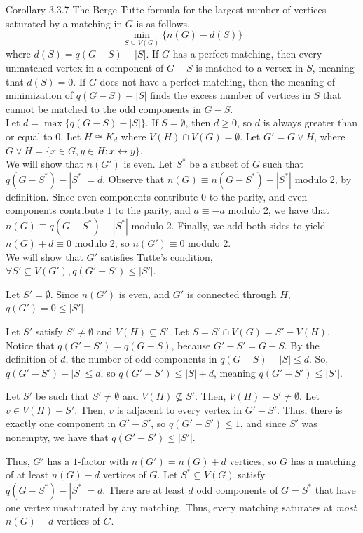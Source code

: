 \documentclass[10pt]{extarticle}
\begin{document}
  \begin{problem}{Corollary 3.3.7}
    The Berge-Tutte formula for the largest number of vertices saturated by a matching in $G$ is as follows.
    \[
      \underset{S\subseteq V(G)}{\min}\{n(G) - d(S)\}
    \] 
    where $d(S) = q(G-S) - |S|$.
    \tcblower
    If $G$ has a perfect matching, then every unmatched vertex in a component of $G-S$ is matched to a vertex in $S$, meaning that $d(S) = 0$. If $G$ does not have a perfect matching, then the meaning of minimization of $q(G - S) - |S|$ finds the excess number of vertices in $S$ that cannot be matched to the odd components in $G-S$.\\

    Let $d = \max\{q(G-S) - |S|\}$. If $S = \emptyset$, then $d \geq 0$, so $d$ is always greater than or equal to $0$. Let $H \cong K_d$ where $V(H) \cap V(G) = \emptyset$. Let $G' = G \vee H$, where $G\vee H = \{x\in G, y\in H: x\leftrightarrow y\}$.\\

    We will show that $n(G')$ is even. Let $S^*$ be a subset of $G$ such that $q(G-S^*) - |S^*| = d$. Observe that $n(G) \equiv n(G-S^*) + |S^*|$ modulo 2, by definition. Since even components contribute $0$ to the parity, and even components contribute $1$ to the parity, and $a\equiv -a$ modulo 2, we have that $n(G) \equiv q(G-S^*) - |S^*|$ modulo 2. Finally, we add both sides to yield $n(G) + d \equiv 0$ modulo 2, so $n(G')\equiv 0$ modulo 2.\\

    We will show that $G'$ satisfies Tutte's condition, $\forall S'\subseteq V(G'),q(G'-S') \leq |S'|$.
    \begin{description}[font=\normalfont\scshape]
      \item[Case 0] Let $S' = \emptyset$. Since $n(G')$ is even, and $G'$ is connected through $H$, $q(G') = 0 \leq |S'|$.
      \item[Case 1] Let $S'$ satisfy $S' \neq \emptyset$ and $V(H) \subseteq S'$. Let $S = S'\cap V(G) = S'-V(H)$. Notice that $q(G' - S') = q(G-S)$, because $G'-S' = G-S$. By the definition of $d$, the number of odd components in $q(G-S) - |S| \leq d$. So, $q(G'-S') - |S| \leq d$, so $q(G'-S') \leq |S| + d$, meaning $q(G' - S') \leq |S'|$.
      \item[Case 2] Let $S'$ be such that $S' \neq \emptyset$ and $V(H) \not\subseteq S'$. Then, $V(H) - S' \neq \emptyset$. Let $v\in V(H) - S'$. Then, $v$ is adjacent to every vertex in $G'- S'$. Thus, there is exactly one component in $G'-S'$, so $q(G'-S') \leq 1$, and since $S'$ was nonempty, we have that $q(G'-S') \leq |S'|$.
     \end{description}
     Thus, $G'$ has a $1$-factor with $n(G') = n(G) + d$ vertices, so $G$ has a matching of at least $n(G) - d$ vertices of $G$. Let $S^* \subseteq V(G)$ satisfy $q(G-S^*) - |S^*| = d$. There are at least $d$ odd components of $G=S^*$ that have one vertex unsaturated by any matching. Thus, every matching saturates at \textit{most} $n(G) - d$ vertices of $G$.
  \end{problem}
\end{document}
